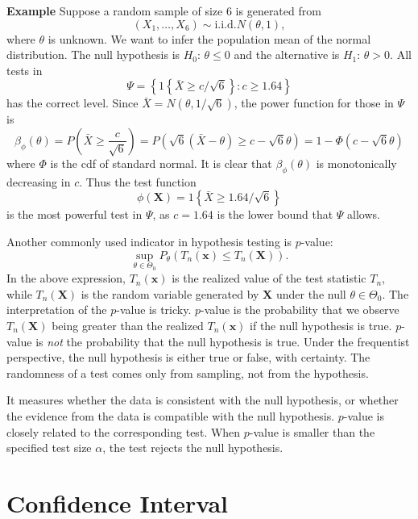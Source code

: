 \documentclass[11pt]{article}
\begin{document}
\textbf{Example} Suppose a random sample of size 6 is generated from
\[\left(X_{1},\ldots,X_{6}\right)\sim\text{i.i.d.}N\left(\theta,1\right),\]
where \(\theta\) is unknown. We want to infer the population mean of the
normal distribution. The null hypothesis is \(H_{0}\): \(\theta\leq0\)
and the alternative is \(H_{1}\): \(\theta>0\). All tests in
\[\Psi=\left\{ 1\left\{ \bar{X}\geq c/\sqrt{6}\right\} :c\geq1.64\right\}\]
has the correct level. Since
\(\bar{X}=N\left(\theta,1/\sqrt{6}\right)\), the power function for
those in \(\Psi\) is
\[\beta_{\phi}\left(\theta\right)=P\left(\bar{X}\geq\frac{c}{\sqrt{6}}\right)=P\left(\sqrt{6}\left(\bar{X}-\theta\right)\geq c-\sqrt{6}\theta\right)=1-\Phi\left(c-\sqrt{6}\theta\right)\]
where \(\Phi\) is the cdf of standard normal. It is clear that
\(\beta_{\phi}\left(\theta\right)\) is monotonically decreasing in
\(c\). Thus the test function
\[\phi\left(\mathbf{X}\right)=1\left\{ \bar{X}\geq 1.64/\sqrt{6}\right\}\]
is the most powerful test in \(\Psi\), as \(c=1.64\) is the lower bound
that \(\Psi\) allows.

    Another commonly used indicator in hypothesis testing is \(p\)-value:
\[\sup_{\theta\in\Theta_{0}}P_{\theta}\left(T_{n}\left(\mathbf{x}\right)\leq T_{n}\left(\mathbf{X}\right)\right).\]
In the above expression, \(T_{n}\left(\mathbf{x}\right)\) is the
realized value of the test statistic \(T_{n}\), while
\(T_{n}\left(\mathbf{X}\right)\) is the random variable generated by
\(\mathbf{X}\) under the null \(\theta\in\Theta_{0}\). The
interpretation of the \(p\)-value is tricky. \(p\)-value is the
probability that we observe \(T_n (\mathbf{X})\) being greater than the
realized \(T_n (\mathbf{x} )\) if the null hypothesis is true.
\(p\)-value is \emph{not} the probability that the null hypothesis is
true. Under the frequentist perspective, the null hypothesis is either
true or false, with certainty. The randomness of a test comes only from
sampling, not from the hypothesis.

It measures whether the data is consistent with the null hypothesis, or
whether the evidence from the data is compatible with the null
hypothesis. \(p\)-value is closely related to the corresponding test.
When \(p\)-value is smaller than the specified test size \(\alpha\), the
test rejects the null hypothesis.

    \section{Confidence Interval}\label{confidence-interval}
\end{document}
